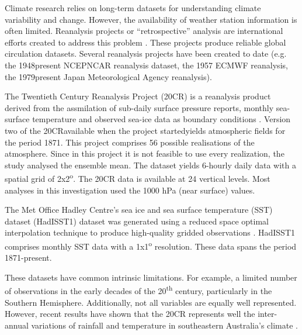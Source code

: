 Climate research relies on long-term datasets for understanding climate
variability and change. However, the availability of weather station 
information is often limited. Reanalysis projects
or \textquotedblleft retrospective\textquotedblright{} analysis are
international efforts created to address this problem \citep{Compo2011}.
These projects produce reliable global circulation datasets. Several
reanalysis projects have been created to date (e.g. the 1948\textendash present
NCEP\textendash NCAR reanalysis dataset, the 1957
ECMWF reanalysis, the 1979\textendash present Japan Meteorological
Agency reanalysis). 

The Twentieth Century Reanalysis Project (20CR) is a reanalysis product
derived from the assmilation of sub-daily surface pressure reports,
monthly sea-surface temperature and observed sea-ice data as boundary
conditions \citep{Compo2011}. Version two of the 20CR\textemdash available
when the project started\textemdash yields atmospheric fields for
the period 1871. This project comprises 56 possible
realisations of the atmosphere. Since in this project it is not feasible
to use every realization, the study analysed the ensemble mean. The
dataset yields 6-hourly daily data with a spatial grid of 2x2\textsuperscript{o}.
The 20CR data is available at 24 vertical levels. Most analyses in
this investigation used the 1000 hPa (near surface) values.

The Met Office Hadley Centre\textquoteright s sea ice and sea surface
temperature (SST) dataset (HadISST1) dataset was generated using a
reduced space optimal interpolation technique to produce high-quality
gridded observations \citep{Rayner2003}. HadISST1 comprises monthly
SST data with a 1x1\textsuperscript{o} resolution. These data spans
the period 1871-present.

These datasets have common intrinsic limitations. For example, a limited
number of observations in the early decades of the 20\textsuperscript{th}
century, particularly in the Southern Hemisphere.
Additionally, not all variables are equally well represented. However,
recent results have shown that the 20CR represents well the inter-annual variations 
of rainfall and temperature in southeastern Australia\textquoteright s climate \citep{Ashcroft2014}. 


